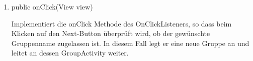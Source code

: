 \begin{enumerate}
\begin{enumerate}
		\item public onClick(View view)
		
		Implementiert die onClick Methode des OnClickListeners, so dass beim Klicken auf den Next-Button überprüft wird, ob der gewünschte Gruppenname zugelassen ist. In diesem Fall legt er eine neue Gruppe an und leitet an dessen GroupActivity weiter.
	\end{enumerate}

\end{enumerate}